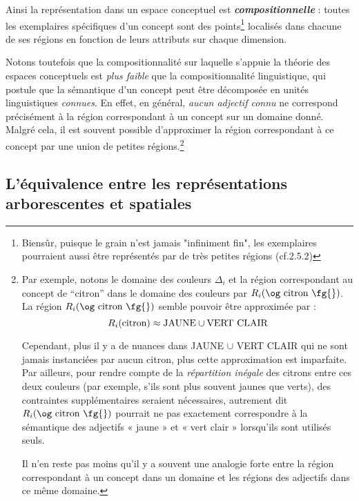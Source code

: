 \documentclass{article}
\newcommand{\bolditalic}[1]{\textbf{\textit{#1}}}
\begin{document}
Ainsi la représentation dans un espace conceptuel est \bolditalic{compositionnelle} : toutes les exemplaires spécifiques d'un concept sont des points\footnote{Biensûr, puisque le grain n'est jamais "infiniment fin", les exemplaires pourraient aussi être représentés par de très petites régions (cf.2.5.2)}  localisés dans chacune de ses régions en fonction de leurs attributs sur chaque dimension.
\par
Notons toutefois que la compositionnalité sur laquelle s’appuie la théorie des espaces conceptuels est \textit{plus faible} que la compositionnalité linguistique, qui postule que la sémantique d’un concept peut être décomposée en unités linguistiques \textit{connues}. En effet, en général, \textit{aucun adjectif connu} ne correspond précisément à la région correspondant à un concept sur un domaine donné. Malgré cela, il est souvent possible d’approximer la région correspondant à ce concept par une union de petites régions.\footnote{Par exemple, notons le domaine des couleurs $\Delta_i$ et la région correspondant au concept de ``citron'' dans le domaine des couleurs par $R_i(\text{\og citron \fg{}})$. La région $R_i(\text{\og citron \fg{}})$ semble pouvoir être approximée par :
\[R_i(\text{citron}) \approx \text{JAUNE} \cup \text{\mbox{VERT CLAIR}}\]

Cependant, plus il y a de nuances dans JAUNE $\cup$ VERT CLAIR qui ne sont jamais instanciées par aucun citron, plus cette approximation est imparfaite. Par ailleurs, pour rendre compte de la \textit{répartition inégale} des citrons entre ces deux couleurs (par exemple, s’ils sont plus souvent jaunes que verts), des contraintes supplémentaires seraient nécessaires, autrement dit $R_i(\text{\og citron \fg{}})$ pourrait ne pas exactement correspondre à la sémantique des adjectifs « jaune » et « vert clair » lorsqu’ils sont utilisés seuls.
\par Il n’en reste pas moins qu’il y a souvent une analogie forte entre la région correspondant à un concept dans un domaine et les régions des adjectifs dans ce même domaine.}

\subsection*{L’équivalence entre les représentations arborescentes et spatiales}

\doublespacing  %
\end{document}
